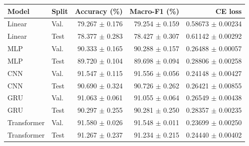 \begin{tabular}{llrrr}
\toprule
Model & Split & Accuracy (\%) & Macro-F1 (\%) & CE loss \\
\midrule
Linear & Val. & 79.267 $\pm$ 0.176 & 79.254 $\pm$ 0.159 & 0.58673 $\pm$ 0.00234 \\
Linear & Test & 78.377 $\pm$ 0.283 & 78.427 $\pm$ 0.307 & 0.61142 $\pm$ 0.00292 \\
MLP & Val. & 90.333 $\pm$ 0.165 & 90.288 $\pm$ 0.157 & 0.26488 $\pm$ 0.00057 \\
MLP & Test & 89.720 $\pm$ 0.104 & 89.698 $\pm$ 0.094 & 0.28806 $\pm$ 0.00258 \\
CNN & Val. & 91.547 $\pm$ 0.115 & 91.556 $\pm$ 0.056 & 0.24148 $\pm$ 0.00427 \\
CNN & Test & 90.690 $\pm$ 0.324 & 90.726 $\pm$ 0.262 & 0.26421 $\pm$ 0.00855 \\
GRU & Val. & 91.063 $\pm$ 0.061 & 91.055 $\pm$ 0.064 & 0.26549 $\pm$ 0.00438 \\
GRU & Test & 90.297 $\pm$ 0.255 & 90.281 $\pm$ 0.250 & 0.28357 $\pm$ 0.00235 \\
Transformer & Val. & 91.580 $\pm$ 0.026 & 91.548 $\pm$ 0.011 & 0.23699 $\pm$ 0.00250 \\
Transformer & Test & 91.267 $\pm$ 0.237 & 91.234 $\pm$ 0.215 & 0.24440 $\pm$ 0.00402 \\
\bottomrule
\end{tabular}
